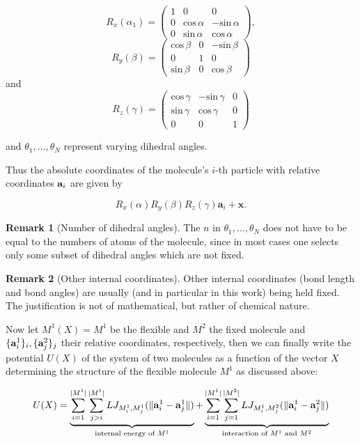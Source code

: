 \documentclass[12pt]{article}
\theoremstyle{definition}\newtheorem*{definition}{Definition}
\theoremstyle{definition}\newtheorem*{remark}{Remark}
\begin{document}
$$R_x(\alpha_1) = \left(\begin{array}{ccc}
1 & 0 & 0 \\
0 & \text{cos}\,\alpha & -\text{sin}\,\alpha \\
0 & \text{sin}\,\alpha &  \text{cos}\,\alpha \end{array}\right),$$ $$R_y(\beta)=\left(\begin{array}{ccc}
\text{cos}\,\beta & 0 & -\text{sin}\,\beta \\
0 & 1 & 0\\
\text{sin}\,\beta & 0 &  \text{cos}\,\beta\end{array}\right)$$ and $$R_z(\gamma) = \left(\begin{array}{ccc}
\text{cos}\,\gamma & -\text{sin}\,\gamma & 0 \\
\text{sin}\,\gamma &  \text{cos}\,\gamma & 0 \\
0 & 0 & 1 \end{array}\right)$$

and $\theta_1,\dots,\theta_N$ represent varying dihedral angles.
	
Thus the absolute coordinates of the molecule's $i$-th particle with relative coordinates $\bold a_i$ are given by

$$R_x(\alpha)R_y(\beta)R_z(\gamma)\mathbf a_i + \mathbf x.$$
	
\begin{remark}[Number of dihedral angles]
	The $n$ in $\theta_1,\dots,\theta_N$ does not have to be equal to the numbers of atoms of the molecule, since in most cases one selects only some subset of dihedral angles which are not fixed.
\end{remark}

\begin{remark}[Other internal coordinates]
	Other internal coordinates (bond length and bond angles) are usually (and in particular in this work) being held fixed. The justification is not of mathematical, but rather of chemical nature.
\end{remark}

Now let $M^1(X)=M^1$ be the flexible and $M^2$ the fixed molecule and $\{\bold a^1_i\}_i, \{\bold a^2_j\}_j$ their relative coordinates, respectively, then we can finally write the potential $U(X)$ of the system of two molecules as a function of the vector $X$ determining the structure of the flexible molecule $M^1$ as discussed above:

\begin{equation}\label{eq:potential_of_system}
	U(X) =
\underbrace{\sum_{i=1}^{|M^1|}\sum_{j>i}^{|M^1|}LJ_{M^1_i,M^1_j}(\|\bold a^1_i-\bold a^1_j\|)}_{\text{internal energy of }M^1} + \underbrace{\sum_{i=1}^{|M^1|}\sum_{j=1}^{|M^2|}LJ_{M^1_i,M^2_j}(\|\bold a^1_i-\bold a^2_j\|)}_{\text{interaction of }M^1\text{ and }M^2}
\end{equation}
\end{document}
